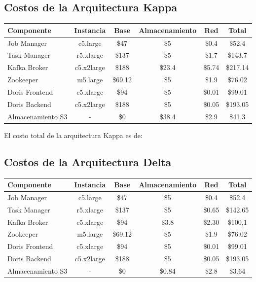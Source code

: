 \newpage
\subsection{Costos de la Arquitectura Kappa}

\begin{longtable}{|p{3cm}|c|c|c|c|c|}
    \hline
    \textbf{Componente} & \textbf{Instancia} & \textbf{Base} & \textbf{Almacenamiento} & \textbf{Red} & \textbf{Total} \\
    \hline
    Job Manager & c5.large & \$47 & \$5 & \$0.4 & \$52.4 \\
    \hline
    Task Manager & r5.xlarge & \$137 & \$5 & \$1.7 & \$143.7 \\
    \hline
    Kafka Broker & c5.x2large & \$188 & \$23.4 & \$5.74 & \$217.14 \\
    \hline
    Zookeeper & m5.large & \$69.12 & \$5 & \$1.9 & \$76.02 \\
    \hline
    Doris Frontend & c5.xlarge & \$94 & \$5 & \$0.01 & \$99.01 \\
    \hline
    Doris Backend & c5.x2large & \$188 & \$5 & \$0.05 & \$193.05 \\
    \hline
    Almacenamiento S3 & - & \$0 & \$38.4 & \$2.9 & \$41.3 \\
    \hline
\end{longtable}

El costo total de la arquitectura Kappa es de: 
\newline
\newline
{}
\newpage


\subsection{Costos de la Arquitectura Delta}

\begin{longtable}{|p{3cm}|c|c|c|c|c|}
    \hline
    \textbf{Componente} & \textbf{Instancia} & \textbf{Base} & \textbf{Almacenamiento} & \textbf{Red} & \textbf{Total} \\
    \hline
    Job Manager & c5.large & \$47 & \$5 & \$0.4 & \$52.4 \\
    \hline
    Task Manager & r5.xlarge & \$137 & \$5 & \$0.65 & \$142.65 \\
    \hline
    Kafka Broker & c5.xlarge & \$94 & \$3.8 & \$2.30 & \$100,1 \\
    \hline
    Zookeeper & m5.large & \$69.12 & \$5 & \$1.9 & \$76.02 \\
    \hline
    Doris Frontend & c5.xlarge & \$94 & \$5 & \$0.01 & \$99.01 \\
    \hline
    Doris Backend & c5.x2large & \$188 & \$5 & \$0.05 & \$193.05 \\
    \hline
    Almacenamiento S3 & - & \$0 & \$0.84 & \$2.8 & \$3.64 \\
    \hline
\end{longtable}

